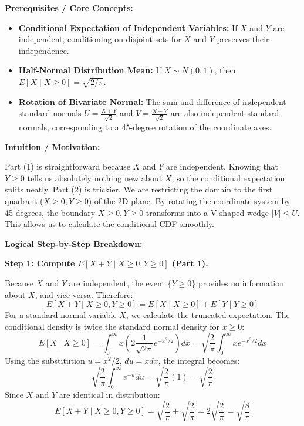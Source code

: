 \begin{solution}
\textbf{Prerequisites / Core Concepts:}
\begin{itemize}
    \item \textbf{Conditional Expectation of Independent Variables:} If $X$ and $Y$ are independent, conditioning on disjoint sets for $X$ and $Y$ preserves their independence.
    \item \textbf{Half-Normal Distribution Mean:} If $X \sim N(0,1)$, then $E[X \mid X \geq 0] = \sqrt{2/\pi}$.
    \item \textbf{Rotation of Bivariate Normal:} The sum and difference of independent standard normals $U = \frac{X+Y}{\sqrt{2}}$ and $V = \frac{X-Y}{\sqrt{2}}$ are also independent standard normals, corresponding to a 45-degree rotation of the coordinate axes.
\end{itemize}

\textbf{Intuition / Motivation:}

Part (1) is straightforward because $X$ and $Y$ are independent. Knowing that $Y \geq 0$ tells us absolutely nothing new about $X$, so the conditional expectation splits neatly.
Part (2) is trickier. We are restricting the domain to the first quadrant ($X \geq 0, Y \geq 0$) of the 2D plane. By rotating the coordinate system by 45 degrees, the boundary $X \geq 0, Y \geq 0$ transforms into a V-shaped wedge $|V| \leq U$. This allows us to calculate the conditional CDF smoothly.

\textbf{Logical Step-by-Step Breakdown:}

\textbf{Step 1: Compute $E[X+Y \mid X \geq 0, Y \geq 0]$ (Part 1).}

Because $X$ and $Y$ are independent, the event $\{Y \geq 0\}$ provides no information about $X$, and vice-versa. Therefore:
\[ E[X+Y \mid X \geq 0, Y \geq 0] = E[X \mid X \geq 0] + E[Y \mid Y \geq 0] \]
For a standard normal variable $X$, we calculate the truncated expectation. The conditional density is twice the standard normal density for $x \geq 0$:
\[ E[X \mid X \geq 0] = \int_0^\infty x \left( 2 \frac{1}{\sqrt{2\pi}} e^{-x^2/2} \right) dx = \sqrt{\frac{2}{\pi}} \int_0^\infty x e^{-x^2/2} dx \]
Using the substitution $u = x^2/2$, $du = x dx$, the integral becomes:
\[ \sqrt{\frac{2}{\pi}} \int_0^\infty e^{-u} du = \sqrt{\frac{2}{\pi}} (1) = \sqrt{\frac{2}{\pi}} \]
Since $X$ and $Y$ are identical in distribution:
\[ E[X+Y \mid X \geq 0, Y \geq 0] = \sqrt{\frac{2}{\pi}} + \sqrt{\frac{2}{\pi}} = 2\sqrt{\frac{2}{\pi}} = \sqrt{\frac{8}{\pi}} \]


\end{solution}
